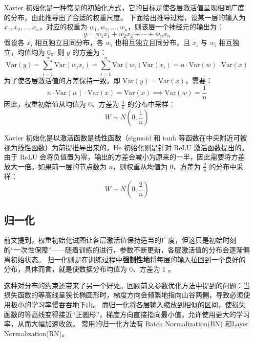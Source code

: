 Xavier 初始化是一种常见的初始化方式，它的目标是使各层激活值呈现相同广度的分布，由此推导出了合适的权重尺度。
下面给出推导过程，设某一层的输入为 $x_1, x_2, \ldots, x_n$，对应的权重为 $w_1, w_2, \ldots, w_n$，则该层一个神经元的输出为：
\begin{equation*}
	y = w_1 x_1 + w_2 x_2 + \cdots + w_n x_n
\end{equation*}
假设各 $x_i$ 相互独立且同分布，各 $w_i$ 也相互独立且同分布，且 $x_i$ 与 $w_i$ 相互独立，均值均为 $0$。则 $y$ 的方差为：
\begin{equation*}
	\mathrm{Var}(y) = \sum_{i=1}^n \mathrm{Var}(w_i x_i) = \sum_{i=1}^n \mathrm{Var}(w_i) \mathrm{Var}(x_i) = n \cdot \mathrm{Var}(w) \cdot \mathrm{Var}(x)
\end{equation*}
为了使各层激活值的方差保持一致，即 $\mathrm{Var}(y) = \mathrm{Var}(x)$，需要：
\begin{equation*}
	n \cdot \mathrm{Var}(w) \cdot \mathrm{Var}(x) = \mathrm{Var}(x) \implies \mathrm{Var}(w) = \frac{1}{n}
\end{equation*}
因此，权重初始值从均值为 $0$、方差为 $\frac{1}{n}$ 的分布中采样：
\begin{equation*}
	W \sim N\left(0, \frac{1}{n}\right)
\end{equation*}

Xavier 初始化是以激活函数是线性函数（sigmoid 和 tanh 等函数在中央附近可被视为线性函数）为前提推导出来的，He 初始化则是针对 ReLU 激活函数提出的。
由于 ReLU 会将负值置为零，输出的方差会减小为原来的一半，因此需要将方差放大一倍。如果前一层的节点数为 $n$，则权重从均值为 $0$、方差为 $\frac{2}{n}$ 的分布中采样：
\begin{equation*}
	W \sim N\left(0, \frac{2}{n}\right)
\end{equation*}

\subsection{归一化}
前文提到，权重初始化试图让各层激活值保持适当的广度，但这只是初始时刻的“一次性保障”——随着训练的进行，参数不断更新，各层激活值的分布会逐渐偏离初始状态。
归一化则是在训练过程中\textbf{强制性地}将每层的输入拉回到一个良好的分布，具体而言，就是使数据分布均值为 $0$、方差为 $1$ 。

这种对分布的约束还带来了另一个好处。回顾前文参数优化方法中提到的问题：当损失函数的等高线呈狭长椭圆形时，梯度方向会频繁地指向山谷两侧，导致必须使用极小的学习率慢吞吞地下山。
而归一化将各层输入缩放到相似的区间，使损失函数的等高线变得接近“正圆形”，梯度方向直接指向最小值，允许使用更大的学习率，从而大幅加速收敛。
常用的归一化方法有 Batch Normalization(BN) 和Layer Normalization(RN)。

